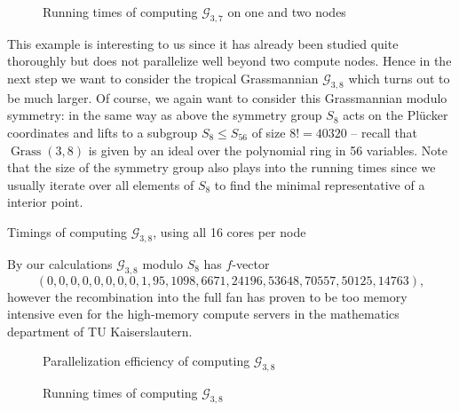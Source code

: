 \documentclass[
  paper=a4,
  titlepage,
  bibliography=totoc,
  pagesize=pdftex
]{scrartcl}
\numberwithin{figure}{section}
\numberwithin{equation}{section}
\numberwithin{table}{section}
\DeclareMathOperator{\Grass}{Grass}
\theoremstyle{definition}
\numberwithin{definition}{section}
\begin{document}
\begin{figure}[htbp]
  \begin{center}
    
  \end{center}
  \caption{Running times of computing $\mathcal{G}_{3,7}$ on one and two nodes}
  \label{fig:g37sc}
\end{figure}

This example is interesting to us since it has already been studied quite thoroughly but
does not parallelize well beyond two compute nodes. Hence in the next step we want to
consider the tropical Grassmannian $\mathcal G_{3,8}$ which turns out to be much larger.
Of course, we again want to consider this Grassmannian modulo symmetry: in the same way as
above the symmetry group $S_8$ acts on the Plücker coordinates and lifts to a subgroup
$S_8 \leq S_{56}$ of size $8!=40320$ -- recall that $\Grass(3,8)$ is given by an ideal
over the polynomial ring in 56 variables. Note that the size of the symmetry group also
plays into the running times since we usually iterate over all elements of $S_8$ to find
the minimal representative of a interior point.

\begin{table}[tbh]
  \centering
  \caption{Timings of computing $\mathcal G_{3,8}$, using all 16 cores per node}
  \label{tab:g38}
\end{table}

By our calculations $\mathcal G_{3,8}$ modulo $S_8$ has $f$-vector
\[
  (0,0,0,0,0,0,0,0,1,95,1098,6671,24196,53648,70557,50125,14763),
\]
however the recombination into the full fan has proven to be too memory intensive even
for the high-memory compute servers in the mathematics department of TU Kaiserslautern.

\begin{figure}[htb]
  \begin{center}
    
  \end{center}
  \caption{Parallelization efficiency of computing $\mathcal{G}_{3,8}$}
  \label{fig:g38efficiency}
\end{figure}

\begin{figure}[htbp]
  \begin{center}
    
  \end{center}
  \caption{Running times of computing $\mathcal{G}_{3,8}$}
  \label{fig:g38scaling}
\end{figure}
\end{document}
